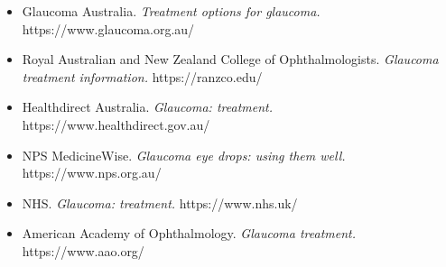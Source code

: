 \begin{itemize}
    \item Glaucoma Australia. \textit{Treatment options for glaucoma.} https://www.glaucoma.org.au/
    \item Royal Australian and New Zealand College of Ophthalmologists. \textit{Glaucoma treatment information.} https://ranzco.edu/
    \item Healthdirect Australia. \textit{Glaucoma: treatment.} https://www.healthdirect.gov.au/
    \item NPS MedicineWise. \textit{Glaucoma eye drops: using them well.} https://www.nps.org.au/
    \item NHS. \textit{Glaucoma: treatment.} https://www.nhs.uk/
    \item American Academy of Ophthalmology. \textit{Glaucoma treatment.} https://www.aao.org/
\end{itemize}
